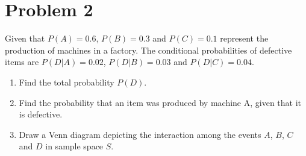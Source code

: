 \documentclass[11pt,twoside]{article}
\newcommand{\pts}[1]{\marginpar{ \small\hspace{0pt} \textit{[#1]} } }
\newcommand{\?}{\stackrel{?}{=}}
\begin{document}





\section*{Problem 2 }
Given that $P (A) = 0.6$, $P (B) = 0.3$ and $P(C) = 0.1$ represent the production of machines in a
factory. The conditional probabilities of defective items are $P(D|A) = 0.02$, $P (D|B) = 0.03$ and
$P (D|C) = 0.04$.

\begin{enumerate}[\bf (a)]
\item Find the total probability $P(D)$. \pts{3}
 
  \item Find the \pts{3} probability that an item was produced by machine A, given that it is defective.
 
  \item Draw a Venn \pts{3} diagram depicting the interaction among the events $A$, $B$, $C$ and $D$ in sample space $S$.
    

\end{enumerate}
\end{document}
